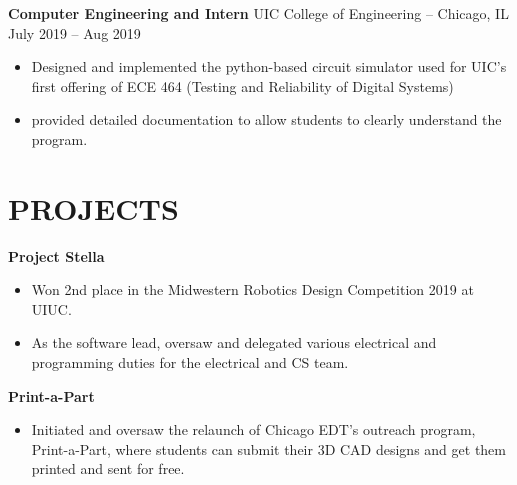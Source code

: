 \documentclass[11pt,letterpaper]{article}
\begin{document}
\textbf{Computer Engineering and Intern} UIC College of Engineering -- Chicago, IL \hfill July 2019 -- Aug 2019 \\
\vspace{-10pt}
\begin{itemize}
  \item Designed and implemented the python-based circuit simulator used for UIC's first offering of ECE 464 (Testing and Reliability of Digital Systems)
  \item provided detailed documentation to allow students to clearly understand the program.
\end{itemize}
\begin{comment}
\textbf{Engineering Student Ambassador and Mentor} UIC College of Engineering -- Chicago, IL \hfill July 2019 -- Aug 2019 \\
\vspace{-10pt}
\begin{itemize}
  \item Taught review classes and workshops on Math, Physics, Chemistry, Robotics, Circuits,among others, for 18 incoming freshmen.
  \item Guided my personal mentee’s success and first year experience at the University
\end{itemize}
\end{comment}

\section{PROJECTS}
\textbf{Project Stella} \hfill
\vspace{-10pt}
\begin{itemize}
  \item Won 2nd place in the Midwestern Robotics Design Competition 2019 at UIUC.
  \item As the software lead,  oversaw and delegated various electrical and programming duties for the electrical and CS team.
\end{itemize}
\textbf{Print-a-Part} \\
\vspace{-10pt}
\begin{itemize}
  \item  Initiated and oversaw the relaunch of Chicago EDT's outreach program, Print-a-Part, where students can submit their 3D CAD designs and get them printed and sent for free.
\end{itemize}
\begin{comment}
\textbf{NASA Robot Mining Competition -- Team Lunabotics} \\
\vspace{-10pt}
\begin{itemize}
  \item  Initiated and oversaw the conversion of Chicago EDT's  existing assets from Altium Designer to Autodesk EAGLE \\
\end{itemize}
\end{comment}
\end{document}
